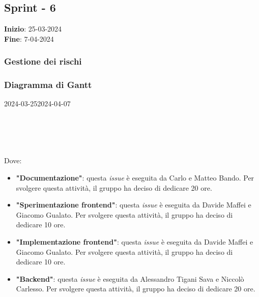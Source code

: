 \subsection{Sprint - 6}
\textbf{Inizio}: 25-03-2024 \\
\textbf{Fine}: 7-04-2024

\subsubsection{Gestione dei rischi}

\subsubsection{Diagramma di Gantt}

\begin{ganttchart}[
		x unit=0.6cm, %
		y unit chart=0.6cm,
		bar/.style={fill=blue!50},
		bar height=0.5,
		time slot format=isodate,
		time slot unit=day,
		vgrid,
		today=2024-03-26,
		today rule/.style={draw=red, ultra thick}
	]{2024-03-25}{2024-04-07}
	 \\
	 \\
	 \\
	 \\
	 \\
\end{ganttchart}

Dove:
\begin{itemize}
	\item \textbf{"Documentazione"}: questa \textit{issue} è eseguita da
	      Carlo e Matteo Bando. Per svolgere questa attività, il gruppo ha deciso di
	      dedicare 20 ore.

	\item \textbf{"Sperimentazione frontend"}: questa \textit{issue} è eseguita
	      da Davide Maffei e Giacomo Gualato. Per svolgere questa attività, il
	      gruppo ha deciso di dedicare 10 ore.

	\item \textbf{"Implementazione frontend"}: questa \textit{issue} è eseguita
	      da Davide Maffei e Giacomo Gualato. Per svolgere questa attività, il
	      gruppo ha deciso di dedicare 10 ore.

	\item \textbf{"Backend"}: questa \textit{issue} è eseguita da Alessandro
	      Tigani Sava e Niccolò Carlesso. Per svolgere questa attività, il
	      gruppo ha deciso di dedicare 20 ore.
\end{itemize}

